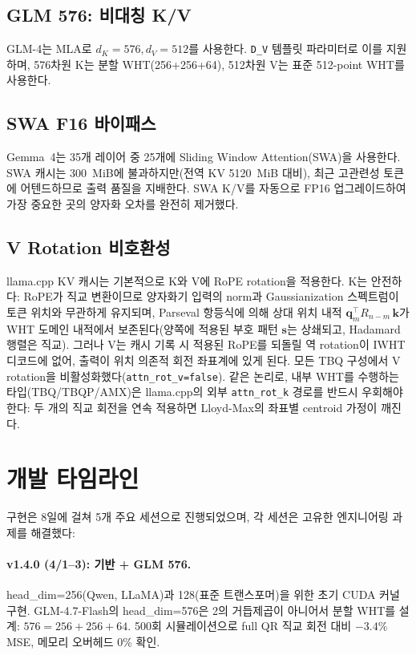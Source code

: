 \documentclass[10pt,twocolumn]{article}
\begin{document}
\subsection{GLM 576: 비대칭 K/V}

GLM-4는 MLA로 $d_K=576, d_V=512$를 사용한다. \texttt{D\_V} 템플릿 파라미터로 이를 지원하며, 576차원 K는 분할 WHT(256+256+64), 512차원 V는 표준 512-point WHT를 사용한다.

\subsection{SWA F16 바이패스}

Gemma~4는 35개 레이어 중 25개에 Sliding Window Attention(SWA)을 사용한다. SWA 캐시는 300~MiB에 불과하지만(전역 KV 5120~MiB 대비), 최근 고관련성 토큰에 어텐드하므로 출력 품질을 지배한다. SWA K/V를 자동으로 FP16 업그레이드하여 가장 중요한 곳의 양자화 오차를 완전히 제거했다.

\subsection{V Rotation 비호환성}

llama.cpp KV 캐시는 기본적으로 K와 V에 RoPE rotation을 적용한다. K는 안전하다: RoPE가 직교 변환이므로 양자화기 입력의 norm과 Gaussianization 스펙트럼이 토큰 위치와 무관하게 유지되며, Parseval 항등식에 의해 상대 위치 내적 $\mathbf{q}_m^\top R_{n-m}\, \mathbf{k}$가 WHT 도메인 내적에서 보존된다(양쪽에 적용된 부호 패턴 $\mathbf{s}$는 상쇄되고, Hadamard 행렬은 직교). 그러나 V는 캐시 기록 시 적용된 RoPE를 되돌릴 역 rotation이 IWHT 디코드에 없어, 출력이 위치 의존적 회전 좌표계에 있게 된다. 모든 TBQ 구성에서 V rotation을 비활성화했다(\texttt{attn\_rot\_v=false}). 같은 논리로, 내부 WHT를 수행하는 타입(TBQ/TBQP/AMX)은 llama.cpp의 외부 \texttt{attn\_rot\_k} 경로를 반드시 우회해야 한다: 두 개의 직교 회전을 연속 적용하면 Lloyd-Max의 좌표별 centroid 가정이 깨진다.

\section{개발 타임라인}
\label{sec:timeline}

구현은 8일에 걸쳐 5개 주요 세션으로 진행되었으며, 각 세션은 고유한 엔지니어링 과제를 해결했다:

\paragraph{v1.4.0 (4/1--3): 기반 + GLM 576.}
head\_dim=256(Qwen, LLaMA)과 128(표준 트랜스포머)을 위한 초기 CUDA 커널 구현. GLM-4.7-Flash의 head\_dim=576은 2의 거듭제곱이 아니어서 분할 WHT를 설계: $576 = 256 + 256 + 64$. 500회 시뮬레이션으로 full QR 직교 회전 대비 $-3.4\%$ MSE, 메모리 오버헤드 0\% 확인.
\end{document}
